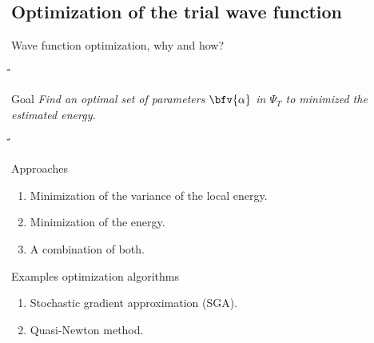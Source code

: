 \subsection{Optimization of the trial wave function}
\begin{frame}{Wave function optimization, why and how?}
	
	\begin{scriptsize}̈́
		\begin{alertblock}{Goal}
			\emph{Find an optimal set of parameters $\bfv{\alpha}$ in $\Psi_T$ to minimized the estimated energy.}
% 			
		\end{alertblock}
	\end{scriptsize}
	
	\begin{scriptsize}̈́
		\begin{alertblock}{Approaches}
			\begin{enumerate}
				\item	Minimization of the variance of the local energy.
				\item Minimization of the energy.
				\item A combination of both.
			\end{enumerate}
		\end{alertblock}

		\begin{alertblock}{Examples optimization algorithms}
			\begin{enumerate}
				\item Stochastic gradient approximation (SGA).
				\item Quasi-Newton method.
			\end{enumerate}
		\end{alertblock}
	\end{scriptsize}
\end{frame}



